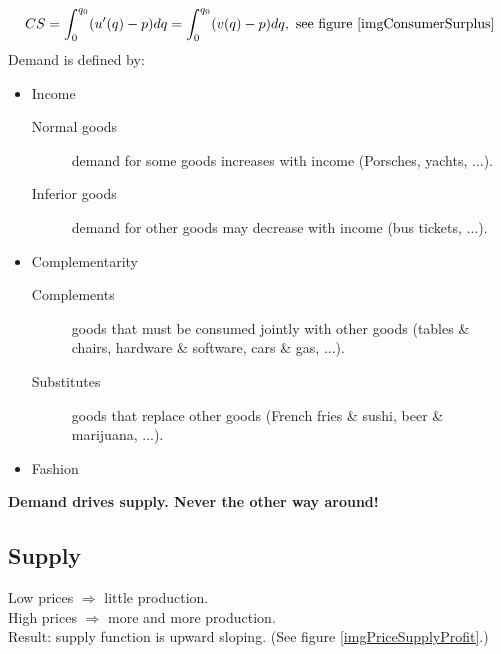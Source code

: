 \documentclass[12pt, a4paper, titlepage]{extarticle}
\begin{document}
	\begin{equation}
		\begin{gathered}
			CS = \int_0^{q_0}(u'(q) - p)dq = \int_0^{q_0}(v(q) - p)dq, \text{ see figure \ref{imgConsumerSurplus}}
		\end{gathered}
	\end{equation}
	Demand is defined by:
	
	\begin{itemize}
		\item Income
		\begin{description}
			\item[Normal goods] demand for some goods increases with income (Porsches, yachts, ...).
			\item[Inferior goods] demand for other goods may decrease with income (bus tickets, ...).
		\end{description}
		\item Complementarity
		\begin{description}
			\item[Complements] goods that must be consumed jointly with other goods (tables \& chairs, hardware \& software, cars \& gas, ...). 
			\item[Substitutes] goods that replace other goods (French fries \& sushi, beer \& marijuana, ...).
		\end{description}
		\item Fashion
	\end{itemize}
	
	\textbf{Demand drives supply. Never the other way around!}
	
	\subsection{Supply}
	
	Low prices $\Rightarrow$ little production.\\
	High prices $\Rightarrow$ more and more production. \\
	Result: supply function is upward sloping. 
	(See figure \ref{imgPriceSupplyProfit}.)\\
	
\end{document}
